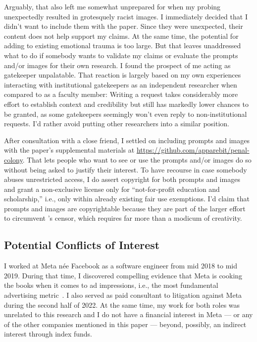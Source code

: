 Arguably, that also left me somewhat unprepared for when my probing unexpectedly
resulted in grotesquely racist images. I immediately decided that I didn't want
to include them with the paper. Since they were unexpected, their content does
not help support my claims. At the same time, the potential for adding to
existing emotional trauma is too large. But that leaves unaddressed what to do
if somebody wants to validate my claims or evaluate the prompts and/or images
for their own research. I found the prospect of me acting as gatekeeper
unpalatable. That reaction is largely based on my own experiences interacting
with institutional gatekeepers as an independent researcher when compared to as
a faculty member: Writing a request takes considerably more effort to establish
context and credibility but still has markedly lower chances to be granted, as
some gatekeepers seemingly won't even reply to non-institutional requests. I'd
rather avoid putting other researchers into a similar position.

After consultation with a close friend, I settled on including prompts and
images with the paper's supplemental materials at
\url{https://github.com/apparebit/penal-colony}. That lets people who want to
see or use the prompts and/or images do so without being asked to justify their
interest. To have recourse in case somebody abuses unrestricted access, I do
assert copyright for both prompts and images and grant a non-exclusive license
only for ``not-for-profit education and scholarship,'' i.e., only within already
existing fair use exemptions. I'd claim that prompts and images are
copyrightable because they are part of the larger effort to circumvent \DALLE's
censor, which requires far more than a modicum of creativity.


\subsection{Potential Conflicts of Interest}

I worked at Meta n\'ee Facebook as a software engineer from mid 2018 to mid
2019. During that time, I discovered compelling evidence that Meta is cooking
the books when it comes to ad impressions, i.e., the most fundamental
advertising metric~. I also served as paid
consultant to litigation against Meta during the second half of 2022. At the
same time, my work for both roles was unrelated to this research and I do not
have a financial interest in Meta --- or any of the other companies mentioned in
this paper --- beyond, possibly, an indirect interest through index funds.
